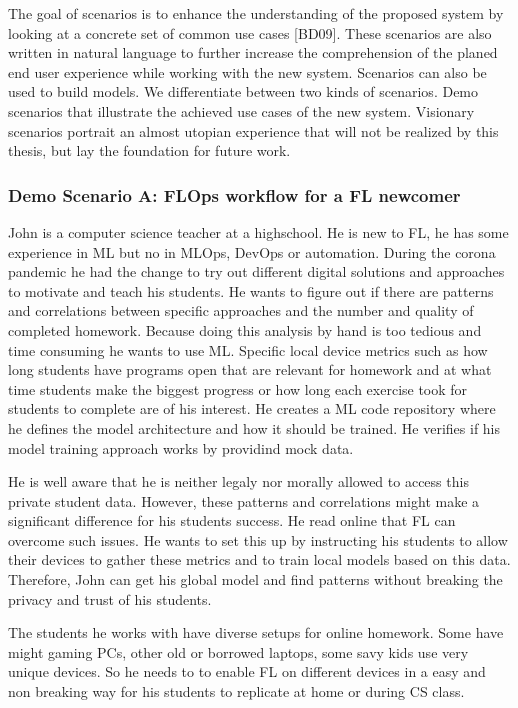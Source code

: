 The goal of scenarios is to enhance the understanding of the proposed system by looking at a concrete set of common use cases [BD09].
These scenarios are also written in natural language to further increase the comprehension of the planed end user experience while working with the new system.
Scenarios can also be used to build models. We differentiate between two kinds of scenarios.
Demo scenarios that illustrate the achieved use cases of the new system.
Visionary scenarios portrait an almost utopian experience that will not be realized by this thesis, but lay the foundation for future work.



\subsubsection{Demo Scenario A: FLOps workflow for a FL newcomer}

John is a computer science teacher at a highschool.
He is new to FL, he has some experience in ML but no in MLOps, DevOps or automation.
During the corona pandemic he had the change to try out different digital solutions and approaches to motivate and teach his students.
He wants to figure out if there are patterns and correlations between specific approaches and the number and quality of completed homework.
Because doing this analysis by hand is too tedious and time consuming he wants to use ML.
Specific local device metrics such as how long students have programs open that are relevant for homework and at what time students make the biggest progress
or how long each exercise took for students to complete are of his interest.
He creates a ML code repository where he defines the model architecture and how it should be trained.
He verifies if his model training approach works by providind mock data.

He is well aware that he is neither legaly nor morally allowed to access this private student data.
However, these patterns and correlations might make a significant difference for his students success.
He read online that FL can overcome such issues.
He wants to set this up by instructing his students to allow their devices to gather these metrics and to train local models based on this data.
Therefore, John can get his global model and find patterns without breaking the privacy and trust of his students.

The students he works with have diverse setups for online homework.
Some have might gaming PCs, other old or borrowed laptops, some savy kids use very unique devices.
So he needs to to enable FL on different devices in a easy and non breaking way for his students to replicate at home or during CS class.

